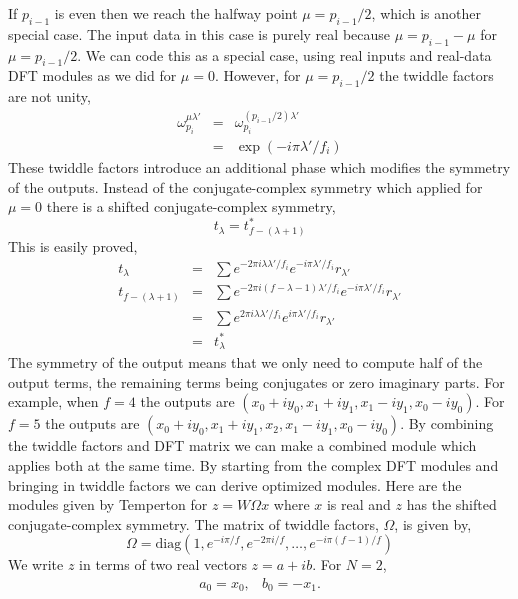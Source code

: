 \documentclass[fleqn,12pt]{article}
\begin{document}
If $p_{i-1}$ is even then we reach the halfway point $\mu=p_{i-1}/2$,
which is another special case. The input data in this case is purely
real because $\mu = p_{i-1} - \mu$ for $\mu = p_{i-1}/2$. We can code
this as a special case, using real inputs and real-data DFT modules as
we did for $\mu=0$. However, for $\mu = p_{i-1}/2$ the twiddle factors
are not unity,
%
\begin{eqnarray}
\omega^{\mu\lambda'}_{p_i} &=& \omega^{(p_{i-1}/2)\lambda'}_{p_i} \\
&=& \exp(-i\pi\lambda'/f_i) 
\end{eqnarray}
%
These twiddle factors introduce an additional phase which modifies the
symmetry of the outputs. Instead of the conjugate-complex symmetry
which applied for $\mu=0$ there is a shifted conjugate-complex
symmetry,
%
\begin{equation}
t_\lambda = t^*_{f-(\lambda+1)}
\end{equation}
%
This is easily proved,
%
\begin{eqnarray}
t_\lambda 
&=& 
\sum e^{-2\pi i \lambda\lambda'/f_i} e^{-i\pi \lambda'/f_i} r_{\lambda'} \\
t_{f - (\lambda + 1)}
&=& 
\sum e^{-2\pi i (f-\lambda-1)\lambda'/f_i} e^{-i\pi \lambda'/f_i} r_{\lambda'} \\
&=& 
\sum e^{2\pi i \lambda\lambda'/f_i} e^{i\pi \lambda'/f_i} r_{\lambda'} \\
&=& t^*_\lambda
\end{eqnarray}
%
The symmetry of the output means that we only need to compute half of
the output terms, the remaining terms being conjugates or zero
imaginary parts. For example, when $f=4$ the outputs are $(x_0 + i
y_0, x_1 + i y_1, x_1 - i y_1, x_0 - i y_0)$. For $f=5$ the outputs
are $(x_0 + i y_0, x_1 + i y_1, x_2, x_1 - i y_1, x_0 - i y_0)$. By
combining the twiddle factors and DFT matrix we can make a combined
module which applies both at the same time. By starting from the
complex DFT modules and bringing in twiddle factors we can derive
optimized modules. Here are the modules given by Temperton for $z = W
\Omega x$ where $x$ is real and $z$ has the shifted conjugate-complex
symmetry. The matrix of twiddle factors, $\Omega$, is given by,
%
\begin{equation}
\Omega = \mathrm{diag}(1, e^{-i\pi/f}, e^{-2\pi i/f}, \dots, e^{-i\pi(f-1)/f})
\end{equation}
%
We write $z$ in terms of two real vectors $z = a + i b$.
%
For $N=2$,
%
\begin{equation}
\begin{array}{ll}
a_0 = x_0, & 
b_0 = - x_1.
\end{array}
\end{equation}
\end{document}
